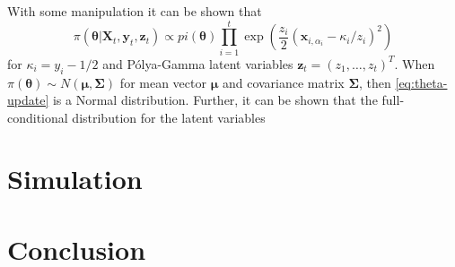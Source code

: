 \documentclass[12pt]{article}
\begin{document}
With some manipulation it can be shown that
\begin{equation}
\pi(\bm{\theta} \vert \bm{X}_t, \bm{y}_t, \bm{z}_t)
\propto pi(\bm{\theta})
\prod_{i = 1}^t \exp(\frac{z_i}{2} (\bm{x}_{i,\alpha_i} - \kappa_i/z_i)^2)
\label{eq:theta-update}
\end{equation}
for $\kappa_i = y_i - 1/2$ and P\'olya-Gamma latent variables 
$\bm{z}_t = (z_1, \ldots, z_t)^T$. 
When $\pi(\bm{\theta}) \sim N(\bm{\mu}, \bm{\Sigma})$ 
for mean vector $\bm{\mu}$ and covariance matrix $\bm{\Sigma}$, then
\eqref{eq:theta-update} is a Normal distribution.
Further, it can be shown that the full-conditional distribution for the latent
variables 

\section{Simulation}


\section{Conclusion}
\end{document}
